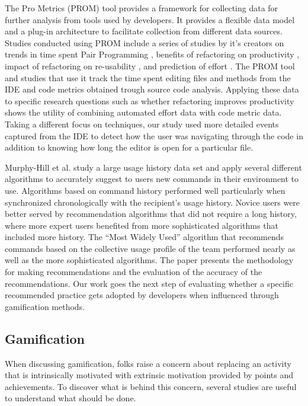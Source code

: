 \documentclass{sig-alternate}
\begin{document}
The Pro Metrics (PROM) tool provides a framework for collecting data for further analysis from tools used by developers.\cite{Coman2009Casestudy}  It provides a flexible data model and a plug-in architecture to facilitate collection from different data sources.  Studies conducted using PROM include a series of studies by it's creators on trends in time spent Pair Programming \cite{Coman2008Investigating}, benefits of refactoring on productivity \cite{Moser2008Case}, impact of refactoring on re-usability \cite{Moser2006Does}, and prediction of effort \cite{Abrahamsson2007Effort}.  The PROM tool and studies that use it track the time spent editing files and methods from the IDE and code metrics obtained trough source code analysis.  Applying these data to specific research questions such as whether refactoring improves productivity \cite{Moser2008Case} shows the utility of combining automated effort data with code metric data.  Taking a different focus on techniques, our study used more detailed events captured from the IDE  to detect how the user was navigating through the code in addition to knowing how long the editor is open for a particular file.

Murphy-Hill et al. study a large usage history data set and apply several different algorithms to accurately suggest to users new commands in their environment to use.\cite{MurphyHill2012Improving} Algorithms based on command history performed well particularly when synchronized chronologically with the recipient's usage history. Novice users were better served by recommendation algorithms that did not require a long history, where more expert users benefited from more sophisticated algorithms that included more history. The ``Most Widely Used'' algorithm that recommends commands based on the collective usage profile of the team performed nearly as well as the more sophisticated algorithms. The paper presents the methodology for making recommendations and the evaluation of the accuracy of the recommendations. Our work goes the next step of evaluating whether a specific recommended practice gets adopted by developers when influenced through gamification methods.

\subsection{Gamification}

When discussing gamification, folks raise a concern about replacing an activity that is intrinsically motivated with extrinsic motivation provided by points and achievements.  To discover what is behind this concern, several studies are useful to understand what should be done. 
\end{document}
